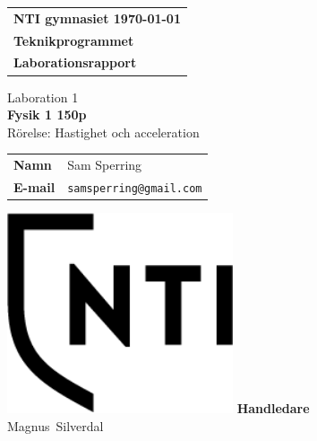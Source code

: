 \documentclass[11p, titlepage, oneside, a4paper]{article}
\makeatletter
\def\inst{Teknikprogrammet}
\def\typeofdoc{Laborationsrapport}
\def\course{Fysik 1 150p}
\def\pretitle{Laboration 1}
\def\title{Rörelse: Hastighet och acceleration}
\def\name{Sam Sperring}
\def\username{samsperring@gmail.com}
\def\email{\username{}}
\def\graders{Magnus Silverdal}
\makeatother
\begin{document}
\begin{titlepage}
		\thispagestyle{empty}
		\begin{large}
			\begin{tabular}{@{}p{\textwidth}@{}}
				\textbf{NTI gymnasiet \hfill \today} \\
				\textbf{\inst} \\
				\textbf{\typeofdoc} \\
			\end{tabular}
		\end{large}
		\vspace{10mm}
		\begin{center}
			\LARGE{\pretitle} \\
			\huge{\textbf{\course}}\\
			\vspace{10mm}
			\LARGE{\title} \\
			\vspace{15mm}
			\begin{large}
				\begin{tabular}{ll}
					\textbf{Namn} & \name \\
					\textbf{E-mail} & \texttt{\email} \\
				\end{tabular}
			\end{large}
			\vfill
            \includegraphics[width=0.5\textwidth]{images/NTI Gymnasiet_Symbol_print_svart.png}
			\vfill
            \large{\textbf{Handledare}}\\
			\mbox{\large{\graders}}
		\end{center}
	\end{titlepage}
\end{document}
